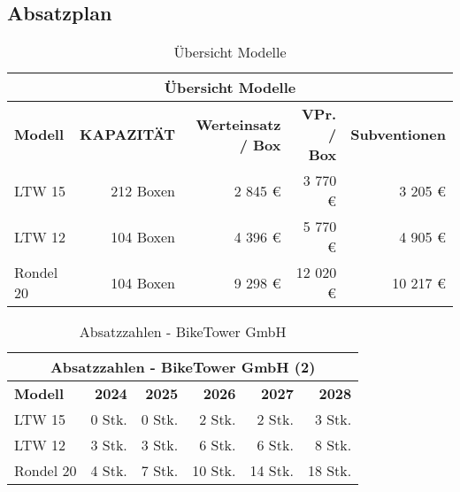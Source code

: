 \subsection{Absatzplan}

\begin{table}[H]
  \centering
  \begin{tabular}{lrrrr}
    \multicolumn{5}{c}{\textbf{Übersicht Modelle}}                                                                  \\
    \toprule
    \textbf{Modell} & \textbf{KAPAZITÄT} & \textbf{Werteinsatz / Box} & \textbf{VPr. / Box} & \textbf{Subventionen} \\
    \midrule
    LTW 15          & 212 Boxen          & 2 845 \euro                & 3 770 \euro         & 3 205 \euro           \\
    LTW 12          & 104 Boxen          & 4 396 \euro                & 5 770 \euro         & 4 905 \euro           \\
    Rondel 20       & 104 Boxen          & 9 298 \euro                & 12 020 \euro        & 10 217 \euro          \\
    \bottomrule
  \end{tabular}
  \caption{Übersicht Modelle}
  \label{tab:uebersicht_modelle}
\end{table}

\begin{table}[H]
  \centering
  \begin{tabular}{lrrrrr}
    \multicolumn{6}{c}{\textbf{Absatzzahlen - BikeTower GmbH (2)}}                                  \\
    \toprule
    \textbf{Modell} & \textbf{2024} & \textbf{2025} & \textbf{2026} & \textbf{2027} & \textbf{2028} \\
    \midrule
    LTW 15          & 0 Stk.        & 0 Stk.        & 2 Stk.        & 2 Stk.        & 3 Stk.        \\
    LTW 12          & 3 Stk.        & 3 Stk.        & 6 Stk.        & 6 Stk.        & 8 Stk.        \\
    Rondel 20       & 4 Stk.        & 7 Stk.        & 10 Stk.       & 14 Stk.       & 18 Stk.       \\
    \midrule
  \end{tabular}
  \caption{Absatzzahlen - BikeTower GmbH}
\end{table}

